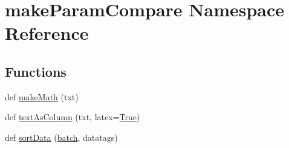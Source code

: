 \hypertarget{namespacemakeParamCompare}{}\section{make\+Param\+Compare Namespace Reference}
\label{namespacemakeParamCompare}
\subsection*{Functions}
\begin{DoxyCompactItemize}
\item 
def \mbox{\hyperlink{namespacemakeParamCompare_a0ba50ebae7e2f64b2c0b7c2565ce9164}{make\+Math}} (txt)
\item 
def \mbox{\hyperlink{namespacemakeParamCompare_af6412cdf7981f80c455ba678d6fe800a}{text\+As\+Column}} (txt, latex=\mbox{\hyperlink{namespacemakeParamCompare_aabddf04b32ac6fb88ad21c814a6d8c8e}{True}})
\item 
def \mbox{\hyperlink{namespacemakeParamCompare_a95ae87ac4d7bb7ad63308082592f2677}{sort\+Data}} (\mbox{\hyperlink{namespacemakeParamCompare_abbe5abdb534d52b49554f0d9cb75209d}{batch}}, datatags)
\end{DoxyCompactItemize}
